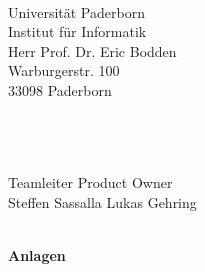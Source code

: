 \documentclass[11pt, a4paper]{letter} %
\begin{document}
\begin{letter}{

	\ \\
	Universität Paderborn\\
	Institut für Informatik\\
	Herr Prof. Dr. Eric Bodden\\
	Warburgerstr. 100\\
	33098 Paderborn
}
\ \\
\ \\
\ \\Teamleiter \hfill Product Owner
\ \\Steffen Sassalla \hfill Lukas Gehring

\ \\\textbf{Anlagen}




\end{letter}
\newpage
 

\newpage
 
\end{document}
